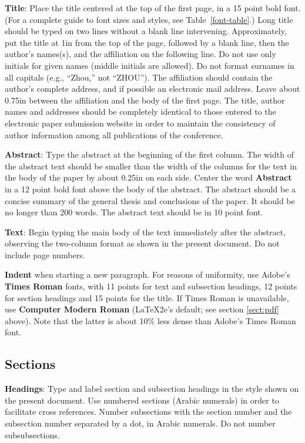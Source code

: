 \documentclass[11pt]{article}
\begin{document}
{\bf Title}: Place the title centered at the top of the first page, in
a 15 point bold font.  (For a complete guide to font sizes and styles, see Table~\ref{font-table}.)
Long title should be typed on two lines without
a blank line intervening. Approximately, put the title at 1in from the
top of the page, followed by a blank line, then the author's names(s),
and the affiliation on the following line.  Do not use only initials
for given names (middle initials are allowed). Do not format surnames
in all capitals (e.g., ``Zhou,'' not ``ZHOU'').  The affiliation should
contain the author's complete address, and if possible an electronic
mail address. Leave about 0.75in between the affiliation and the body
of the first page. The title, author names and addresses should be completely identical to those entered to the electronic paper submission website in order to maintain the consistency of author information among all publications of the conference.

{\bf Abstract}: Type the abstract at the beginning of the first
column.  The width of the abstract text should be smaller than the
width of the columns for the text in the body of the paper by about
0.25in on each side.  Center the word {\bf Abstract} in a 12 point
bold font above the body of the abstract. The abstract should be a
concise summary of the general thesis and conclusions of the paper.
It should be no longer than 200 words. The abstract text should be in 10 point font.

{\bf Text}: Begin typing the main body of the text immediately after
the abstract, observing the two-column format as shown in
the present document. Do not include page numbers.

{\bf Indent} when starting a new paragraph. For reasons of uniformity,
use Adobe's {\bf Times Roman} fonts, with 11 points for text and
subsection headings, 12 points for section headings and 15 points for
the title.  If Times Roman is unavailable, use {\bf Computer Modern
  Roman} (\LaTeX2e's default; see section \ref{sect:pdf} above).
Note that the latter is about 10\% less dense than Adobe's Times Roman
font.

\subsection{Sections}

{\bf Headings}: Type and label section and subsection headings in the
style shown on the present document.  Use numbered sections (Arabic
numerals) in order to facilitate cross references. Number subsections
with the section number and the subsection number separated by a dot,
in Arabic numerals. Do not number subsubsections.
\end{document}
